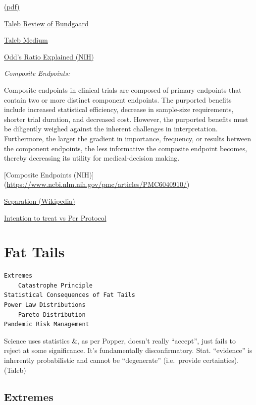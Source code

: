 \documentclass[
]{book}
\begin{document}
\href{pdf/Bundgaard_2020_Mask_Effectiveness_ref_Taleb.pdf}{(pdf)}

\href{https://fooledbyrandomnessdotcom.wordpress.com/2020/11/25/hypothesis-testing-in-the-presence-of-false-positives-the-flaws-in-the-danish-mask-study/}{Taleb Review of Bundgaard}

\href{https://medium.com/incerto/the-masks-masquerade-7de897b517b7}{Taleb Medium}

\href{https://www.ncbi.nlm.nih.gov/pmc/articles/PMC2938757/}{Odd's Ratio Explained (NIH)}

\emph{Composite Endpoints:}

Composite endpoints in clinical trials are composed of primary endpoints that contain two or more distinct component endpoints. The purported benefits include increased statistical efficiency, decrease in sample-size requirements, shorter trial duration, and decreased cost. However, the purported benefits must be diligently weighed against the inherent challenges in interpretation. Furthermore, the larger the gradient in importance, frequency, or results between the component endpoints, the less informative the composite endpoint becomes, thereby decreasing its utility for medical-decision making.

{[}Composite Endpoints (NIH){]} (\url{https://www.ncbi.nlm.nih.gov/pmc/articles/PMC6040910/})

\href{https://en.wikipedia.org/wiki/Separation_(statistics)}{Separation (Wikipedia)}

\href{https://www.ncbi.nlm.nih.gov/pmc/articles/PMC5654877/}{Intention to treat vs Per Protocol}

\hypertarget{fat-tails}{%
\chapter{Fat Tails}\label{fat-tails}}

\begin{verbatim}
Extremes      
    Catastrophe Principle  
Statistical Consequences of Fat Tails  
Power Law Distributions  
    Pareto Distribution  
Pandemic Risk Management
\end{verbatim}

Science uses statistics \&, as per Popper, doesn't really ``accept'',
just fails to reject at some significance.
It's fundamentally disconfirmatory.
Stat. ``evidence'' is inherently probabilistic and
cannot be ``degenerate'' (i.e.~provide certainties).
(Taleb)

\hypertarget{extremes}{%
\section{Extremes}\label{extremes}}
\end{document}
